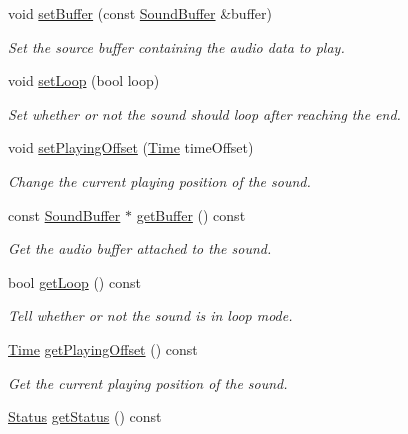 \begin{DoxyCompactItemize}
void \mbox{\hyperlink{classsf_1_1_sound_a8b395e9713d0efa48a18628c8ec1972e}{set\+Buffer}} (const \mbox{\hyperlink{classsf_1_1_sound_buffer}{Sound\+Buffer}} \&buffer)
\begin{DoxyCompactList}\small\item\em Set the source buffer containing the audio data to play. \end{DoxyCompactList}\item 
void \mbox{\hyperlink{classsf_1_1_sound_af23ab4f78f975bbabac031102321612b}{set\+Loop}} (bool loop)
\begin{DoxyCompactList}\small\item\em Set whether or not the sound should loop after reaching the end. \end{DoxyCompactList}\item 
void \mbox{\hyperlink{classsf_1_1_sound_ab905677846558042022dd6ab15cddff0}{set\+Playing\+Offset}} (\mbox{\hyperlink{classsf_1_1_time}{Time}} time\+Offset)
\begin{DoxyCompactList}\small\item\em Change the current playing position of the sound. \end{DoxyCompactList}\item 
const \mbox{\hyperlink{classsf_1_1_sound_buffer}{Sound\+Buffer}} $\ast$ \mbox{\hyperlink{classsf_1_1_sound_ab873727ae652c96b5a9437d7f8d8a44d}{get\+Buffer}} () const
\begin{DoxyCompactList}\small\item\em Get the audio buffer attached to the sound. \end{DoxyCompactList}\item 
bool \mbox{\hyperlink{classsf_1_1_sound_a054da07266ce8f39229495146e3041eb}{get\+Loop}} () const
\begin{DoxyCompactList}\small\item\em Tell whether or not the sound is in loop mode. \end{DoxyCompactList}\item 
\mbox{\hyperlink{classsf_1_1_time}{Time}} \mbox{\hyperlink{classsf_1_1_sound_a559bc3aea581107bcb380fdbe523aa08}{get\+Playing\+Offset}} () const
\begin{DoxyCompactList}\small\item\em Get the current playing position of the sound. \end{DoxyCompactList}\item 
\mbox{\hyperlink{classsf_1_1_sound_source_ac43af72c98c077500b239bc75b812f03}{Status}} \mbox{\hyperlink{classsf_1_1_sound_a406fc363594a7718a53ebef49a870f51}{get\+Status}} () const

\end{DoxyCompactItemize}
